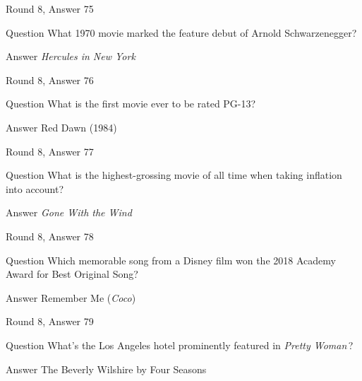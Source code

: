 \documentclass[11pt]{beamer}
\begin{document}
\begin{frame}[t]{Round 8, Answer 75}
\vspace{2em}
\begin{block}{Question}
What 1970 movie marked the feature debut of Arnold Schwarzenegger?
\end{block}
\pause{}
\begin{block}{Answer}
\emph{Hercules in New York}
\end{block}
\end{frame}
    

\begin{frame}[t]{Round 8, Answer 76}
\vspace{2em}
\begin{block}{Question}
What is the first movie ever to be rated PG-13?
\end{block}
\pause{}
\begin{block}{Answer}
Red Dawn (1984)
\end{block}
\end{frame}
    

\begin{frame}[t]{Round 8, Answer 77}
\vspace{2em}
\begin{block}{Question}
What is the highest-grossing movie of all time when taking inflation into account?
\end{block}
\pause{}
\begin{block}{Answer}
\emph{Gone With the Wind}
\end{block}
\end{frame}
    

\begin{frame}[t]{Round 8, Answer 78}
\vspace{2em}
\begin{block}{Question}
Which memorable song from a Disney film won the 2018 Academy Award for Best Original Song?
\end{block}
\pause{}
\begin{block}{Answer}
Remember Me (\emph{Coco})
\end{block}
\end{frame}
    

\begin{frame}[t]{Round 8, Answer 79}
\vspace{2em}
\begin{block}{Question}
What's the Los Angeles hotel prominently featured in \emph{Pretty Woman}\,?
\end{block}
\pause{}
\begin{block}{Answer}
The Beverly Wilshire by Four Seasons
\end{block}
\end{frame}
    
\end{document}
